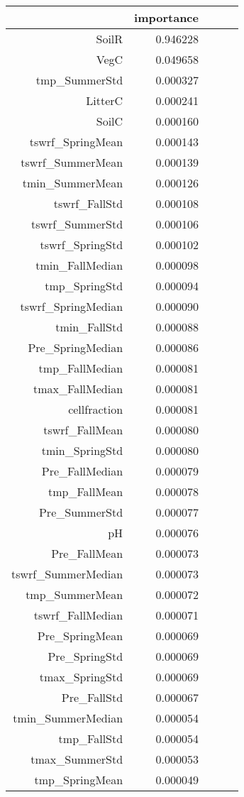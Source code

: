 \begin{tabular}{rrrrr}
\toprule
 & importance \\
\midrule
SoilR & 0.946228 \\
VegC & 0.049658 \\
tmp_SummerStd & 0.000327 \\
LitterC & 0.000241 \\
SoilC & 0.000160 \\
tswrf_SpringMean & 0.000143 \\
tswrf_SummerMean & 0.000139 \\
tmin_SummerMean & 0.000126 \\
tswrf_FallStd & 0.000108 \\
tswrf_SummerStd & 0.000106 \\
tswrf_SpringStd & 0.000102 \\
tmin_FallMedian & 0.000098 \\
tmp_SpringStd & 0.000094 \\
tswrf_SpringMedian & 0.000090 \\
tmin_FallStd & 0.000088 \\
Pre_SpringMedian & 0.000086 \\
tmp_FallMedian & 0.000081 \\
tmax_FallMedian & 0.000081 \\
cellfraction & 0.000081 \\
tswrf_FallMean & 0.000080 \\
tmin_SpringStd & 0.000080 \\
Pre_FallMedian & 0.000079 \\
tmp_FallMean & 0.000078 \\
Pre_SummerStd & 0.000077 \\
pH & 0.000076 \\
Pre_FallMean & 0.000073 \\
tswrf_SummerMedian & 0.000073 \\
tmp_SummerMean & 0.000072 \\
tswrf_FallMedian & 0.000071 \\
Pre_SpringMean & 0.000069 \\
Pre_SpringStd & 0.000069 \\
tmax_SpringStd & 0.000069 \\
Pre_FallStd & 0.000067 \\
tmin_SummerMedian & 0.000054 \\
tmp_FallStd & 0.000054 \\
tmax_SummerStd & 0.000053 \\
tmp_SpringMean & 0.000049 \\

\end{tabular}

